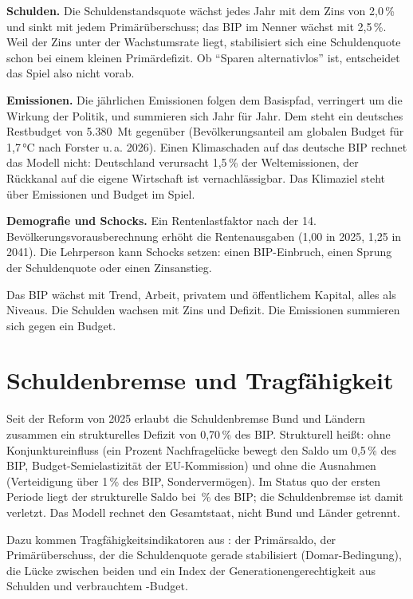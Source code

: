 \textbf{Schulden.} Die Schuldenstandsquote wächst jedes Jahr mit dem Zins von 2,0\,\% und sinkt
mit jedem Primärüberschuss; das BIP im Nenner wächst mit 2,5\,\%. Weil der Zins unter der
Wachstumsrate liegt, stabilisiert sich eine Schuldenquote schon bei einem kleinen
Primärdefizit. Ob \enquote{Sparen alternativlos} ist, entscheidet das Spiel also nicht vorab.

\textbf{Emissionen.} Die jährlichen Emissionen folgen dem Basispfad, verringert um die
Wirkung der Politik, und summieren sich Jahr für Jahr. Dem steht ein deutsches Restbudget von
5.380~Mt gegenüber (Bevölkerungsanteil am globalen Budget für 1,7\,°C nach Forster u.\,a.
2026). Einen Klimaschaden auf das deutsche BIP rechnet das Modell nicht: Deutschland
verursacht 1,5\,\% der Weltemissionen, der Rückkanal auf die eigene Wirtschaft ist
vernachlässigbar. Das Klimaziel steht über Emissionen und Budget im Spiel.

\textbf{Demografie und Schocks.} Ein Rentenlastfaktor nach der 14. Bevölkerungsvorausberechnung
erhöht die Rentenausgaben (1,00 in 2025, 1,25 in 2041). Die Lehrperson kann Schocks setzen:
einen BIP-Einbruch, einen Sprung der Schuldenquote oder einen Zinsanstieg.

\begin{merksatz}
Das BIP wächst mit Trend, Arbeit, privatem und öffentlichem Kapital, alles als Niveaus. Die
Schulden wachsen mit Zins und Defizit. Die Emissionen summieren sich gegen ein Budget.
\end{merksatz}

\section{Schuldenbremse und Tragfähigkeit}

Seit der Reform von 2025 erlaubt die Schuldenbremse Bund und Ländern zusammen ein
strukturelles Defizit von 0,70\,\% des BIP. Strukturell heißt: ohne Konjunktureinfluss (ein
Prozent Nachfragelücke bewegt den Saldo um 0,5\,\% des BIP, Budget-Semielastizität der
EU-Kommission) und ohne die Ausnahmen (Verteidigung über 1\,\% des BIP, Sondervermögen). Im
Status quo der ersten Periode liegt der strukturelle Saldo bei \SQstruktur\,\% des BIP; die
Schuldenbremse ist damit verletzt. Das Modell rechnet den Gesamtstaat, nicht Bund und Länder
getrennt.

Dazu kommen Tragfähigkeitsindikatoren aus : der Primärsaldo, der
Primärüberschuss, der die Schuldenquote gerade stabilisiert (Domar-Bedingung), die Lücke
zwischen beiden und ein Index der Generationengerechtigkeit aus Schulden und verbrauchtem
\COz-Budget.

